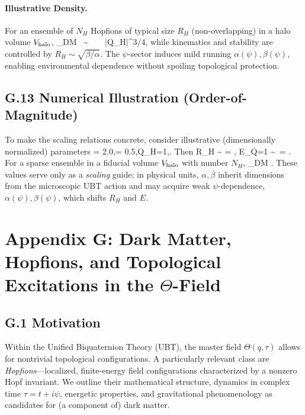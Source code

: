 \documentclass[12pt,a4paper]{article}
\begin{document}
\paragraph{Illustrative Density.} For an ensemble of $N_H$ Hopfions of typical size $R_H$ (non-overlapping) in a halo volume $V_{\rm halo}$,
\rho_{\rm DM} \;\approx\;  \ \sim\  \ \kappa\, \sqrt{\alpha\beta}\, |Q_H|^{3/4},
while kinematics and stability are controlled by $R_H\!\sim\!\sqrt{\beta/\alpha}$. The $\psi$-sector induces mild running $\alpha(\psi),\beta(\psi)$, enabling environmental dependence without spoiling topological protection.
\subsection*{G.13 Numerical Illustration (Order-of-Magnitude)}
To make the scaling relations concrete, consider illustrative (dimensionally normalized) parameters
\alpha = 2.0,\qquad \beta = 0.5,\qquad Q_H=1,\qquad \kappa {}.
Then
R_H \sim \sqrt{\frac{\beta}{\alpha}} \;=\;  \;\approx{},\qquad
E_{Q=1} \sim \kappa\,\sqrt{\alpha\beta} \;=\;  \;\approx{}.
For a sparse ensemble in a fiducial volume $V_{\rm halo}$ with number $N_H$,
\rho_{\rm DM} \;\approx\;  \;\approx\; .
These values serve only as a \emph{scaling} guide; in physical units, $\alpha,\beta$ inherit dimensions from the microscopic UBT action and may acquire weak $\psi$-dependence, $\alpha(\psi),\beta(\psi)$, which shifts $R_H$ and $E$.

\appendix
\section{Appendix G: Dark Matter, Hopfions, and Topological Excitations in the $\Theta$-Field}
\subsection*{G.1 Motivation}
Within the Unified Biquaternion Theory (UBT), the master field $\Theta(q,\tau)$ allows for nontrivial topological configurations. 
A particularly relevant class are \emph{Hopfions}---localized, finite-energy field configurations characterized by a nonzero Hopf invariant. 
We outline their mathematical structure, dynamics in complex time $\tau=t+i\psi$, energetic properties, and gravitational phenomenology as candidates for (a component of) dark matter.
\end{document}
